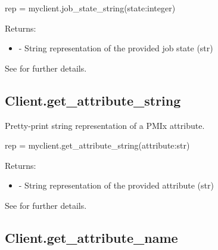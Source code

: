 \pyspecificstart
\begin{codepar}
rep = myclient.job_state_string(state:integer)
\end{codepar}
\pyspecificend

\begin{arglist}
\end{arglist}

Returns:
\begin{itemize}
    \item {} - String representation of the provided job state (str)
\end{itemize}

See  for further details.


\subsection{Client.get_attribute_string}

\summary

Pretty-print string representation of a \ac{PMIx} attribute.

\format

\pyspecificstart
\begin{codepar}
rep = myclient.get_attribute_string(attribute:str)
\end{codepar}
\pyspecificend

\begin{arglist}
\end{arglist}

Returns:
\begin{itemize}
    \item {} - String representation of the provided attribute (str)
\end{itemize}

See  for further details.


\subsection{Client.get_attribute_name}

